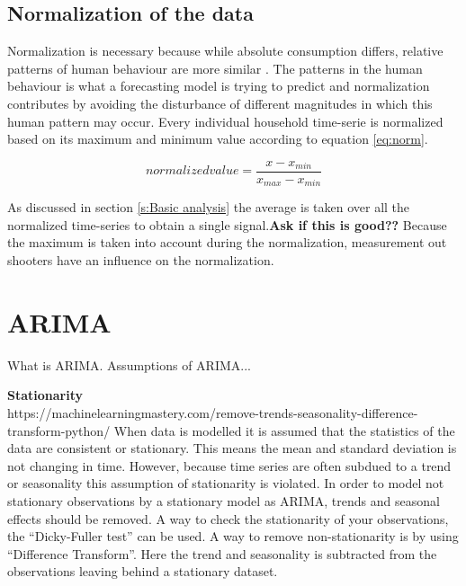 \subsection{Normalization of the data}
Normalization is necessary because while absolute consumption differs, relative patterns of human behaviour are more similar \cite{Lago2020}. The patterns in the human behaviour is what a forecasting model is trying to predict and normalization contributes by avoiding the disturbance of different magnitudes in which this human pattern may occur. Every individual household time-serie is normalized based on its maximum and minimum value according to equation \ref{eq:norm}. 

\begin{equation}\label{eq:norm}
	normalized value = \frac{x - x_{min}}{x_{max} - x_{min}}
\end{equation}  

As discussed in section \ref{s:Basic analysis} the average is taken over all the normalized time-series to obtain a single signal.\textbf{Ask if this is good??}  Because the maximum is taken into account during the normalization, measurement out shooters have an influence on the normalization. 


\section{ARIMA}
What is ARIMA. 
Assumptions of ARIMA...

\textbf{Stationarity}\\
https://machinelearningmastery.com/remove-trends-seasonality-difference-transform-python/
When data is modelled it is assumed that the statistics of the data are consistent or stationary. This means the mean and standard deviation is not changing in time. However, because time series are often subdued to a trend or seasonality this assumption of stationarity is violated. In order to model not stationary observations by a stationary model as ARIMA, trends and seasonal effects should be removed. A way to check the stationarity of your observations, the ``Dicky-Fuller test'' can be used.
A way to remove non-stationarity is by using ``Difference Transform''. Here the trend and seasonality is subtracted from the observations leaving behind a stationary dataset.


